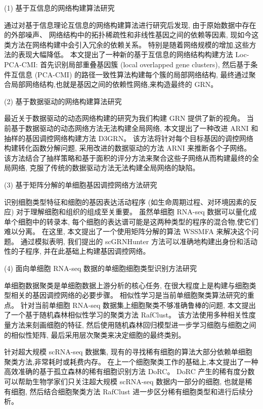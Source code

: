 (1) 基于互信息的网络构建算法研究

通过对基于信息理论互信息的网络构建算法进行研究后发现,
由于原始数据中存在的外部噪声、
网络结构中的拓扑稀疏性和非线性基因之间的依赖等因素,
现如今这类方法在网络构建中会引入冗余的依赖关系。
特别是随着网络规模的增加,这些方法的表现大幅降低。
本文提出了一种新的基于互信息的网络结构构建方法 Loc-PCA-CMI:
首先识别局部重叠基因簇 (local overlapped gene clusters),
然后基于条件互信息 (PCA-CMI) 的路径一致性算法构建每个簇的局部网络结构,
最终通过聚合局部网络结构,也就是基因之间的依赖性网络,来构造最终的 GRN。

(2) 基于数据驱动的网络构建算法研究

最近关于数据驱动的动态网络构建的研究为我们构建 GRN 提供了新的视角。
当前基于数据驱动的动态网络方法无法构建全局网络,
本文提出了一种改进 ARNI 和抽样的基因调控网络构建方法 D3GRN。
该方法将针对每个目标基因的调控网络构建转化函数分解问题,
采用改进的数据驱动的方法 ARNI 来推断各个子网络。
该方法结合了抽样策略和基于面积的评分方法来聚合这些子网络从而构建最终的全局网络,
克服了传统的数据驱动方法无法构建全局网络的缺陷。

(3) 基于矩阵分解的单细胞基因调控网络方法研究

识别细胞类型特征和细胞的基因表达活动程序 (如生命周期过程、对环境因素的反应) 对于理解细胞和组织的组成至关重要。
虽然单细胞 RNA-seq 数据可以量化成单个细胞中的转录本,
每个细胞的表达谱可能是这两种类型的程序的混合物,使它们难以分离。
在这里, 本文提出了一个使用矩阵分解的算法 WSSMFA 来解决这个问题。
通过模拟表明, 我们提出的 scGRNHunter 方法可以准确地构建出身份和活动性的子程序, 
并在此基础上构建基因调控网络。


(4) 面向单细胞 RNA-seq 数据的单细胞细胞类型识别方法研究

单细胞数据聚类是单细胞数据上游分析的核心任务, 
在很大程度上是构建与细胞类型相关的基因调控网络的必要步骤。
相似性学习是当前单细胞聚类算法研究的重点。
针对当前单细胞 RNA-seq 数据集上细胞聚类不够准确鲁棒的问题,
本文提出了一个基于随机森林相似性学习的聚类方法 RafClust。
该方法使用多种相关性度量方法来刻画细胞的特征, 
然后使用随机森林回归模型进一步学习细胞与细胞之间的相似性矩阵,
最后采用层次聚类来决定细胞的最终类别。

针对超大规模 scRNA-seq 数据集,
现有的寻找稀有细胞的算法大部分依赖单细胞聚类方法,非常耗时或耗费内存。
在上一个细胞聚类工作的基础上,本文提出了一种高效准确的基于孤立森林的稀有细胞识别方法 DoRC。
DoRC 产生的稀有度分数可以帮助生物学家们只关注超大规模 scRNA-seq 数据内一部分的细胞, 也就是稀有细胞,
然后结合细胞聚类方法 RafClust 进一步区分稀有细胞类型和进行后续分析。

